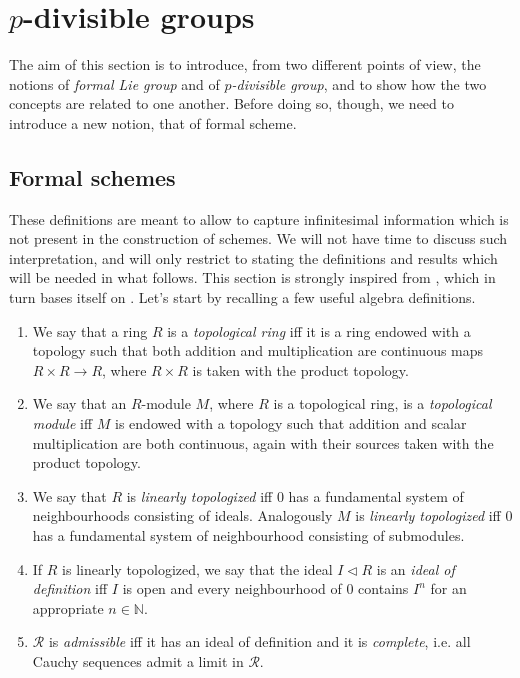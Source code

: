 \section{\texorpdfstring{$p$}{p}-divisible groups}
The aim of this section is to introduce, from two different points of view,
the notions of \emph{formal Lie group}
and of \emph{$p$-divisible group},
and to show how the two concepts are related to one another.
Before doing so, though, we need to introduce a new notion, that
of formal scheme.


\subsection{Formal schemes}
These definitions are meant to allow to capture infinitesimal
information which is not present in the construction of schemes.
We will not have time to discuss such interpretation, and will
only restrict to stating the definitions and results which will
be needed in what follows.
This section is strongly inspired from 
\cite[\href{https://stacks.math.columbia.edu/tag/0AHY}{Section 0AHY}]{SP},
which in turn bases itself on \cite[Chapter I, \S10]{EGA}.
Let's start by recalling a few useful algebra definitions.


\begin{defn}\leavevmode\vspace{-1\baselineskip}
\begin{enumerate}
\item We say that a ring $R$ is a \emph{topological ring} iff it is a ring endowed with a topology
	such that both addition and multiplication are continuous maps
	$R \times R \to R$, where $R \times R$ is taken with the product topology.

\item We say that an $R$-module $M$, where $R$ is a topological ring,
	is a \emph{topological module} iff $M$ is endowed with a topology such that
	addition and scalar multiplication are both continuous, again with their sources
	taken with the product topology.

\item We say that $R$ is \emph{linearly topologized} iff $0$ has a fundamental system
	of neighbourhoods consisting of ideals.
	Analogously $M$ is \emph{linearly topologized} iff $0$ has a fundamental
	system of neighbourhood consisting of submodules.

\item If $R$ is linearly topologized, we say that the ideal $I \triangleleft R$
	is an \emph{ideal of definition} iff $I$ is open and every neighbourhood
	of $0$ contains $I^n$ for an appropriate $n \in \mathbb{N}$.

\item $\mathscr{R}$ is \emph{admissible} iff it has an ideal of definition and it is \emph{complete},
	i.e$.$ all Cauchy sequences admit a limit in \(\mathscr{R}\).
\end{enumerate}
\end{defn}


